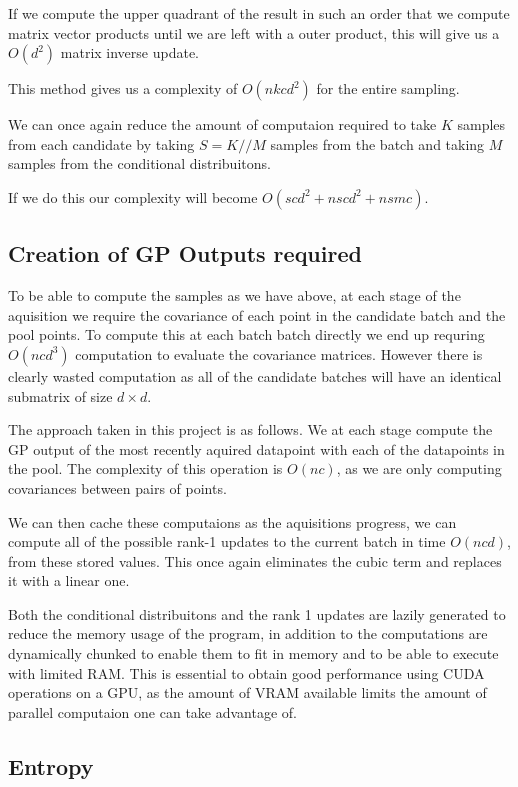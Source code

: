 \documentclass[12pt, a4paper]{report}
\theoremstyle{definition}
\begin{document}
If we compute the upper quadrant of the result in such an order that we compute matrix vector products until we are left with a outer product, this will give us a $O(d^2)$ matrix inverse update.


This method gives us a complexity of  $O\left(nkcd^2 \right)$ for the entire sampling.


We can once again reduce the amount of computaion required to take $K$ samples from each candidate by taking $S = K // M$ samples from the batch and taking $M$ samples from the conditional distribuitons.


If we do this our complexity will become $O\left(scd^2 + nscd^2 + nsmc\right)$.

\subsection{Creation of GP Outputs required}

To be able to compute the samples as we have above, at each stage of the aquisition we require the covariance of each point in the candidate batch and the pool points. To compute this at each batch batch directly we end up requring $O(ncd^3)$ computation to evaluate the covariance matrices. However there is clearly wasted computation as all of the candidate batches will have an identical submatrix of size $d \times d$.

The approach taken in this project is as follows. We at each stage compute the GP output of the most recently aquired datapoint with each of the datapoints in the pool. The complexity of this operation is $O(nc)$, as we are only computing covariances between pairs of points.

We can then cache these computaions as the aquisitions progress, we can compute all of the possible rank-1 updates to the current batch in time $O(ncd)$, from these stored values. This once again eliminates the cubic term and replaces it with a linear one.


Both the conditional distribuitons and the rank 1 updates are lazily generated to reduce the memory usage of the program, in addition to the computations are dynamically chunked to enable them to fit in memory and to be able to execute with limited RAM. This is essential to obtain good performance using CUDA operations on a GPU, as the amount of VRAM available limits the amount of parallel computaion one can take advantage of.

\subsection{Entropy}
\end{document}
